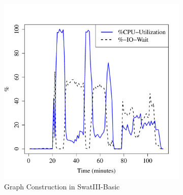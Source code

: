 \documentclass[conference]{IEEEtran}
\begin{document}
\begin{figure}[htb]
        \begin{subfigure}[b]{0.23\textwidth}
                \includegraphics[width=\textwidth]{Figure/SystemData/Plots/BGCPUHDD.pdf}
                \caption{Graph Construction in SwatIII-Basic}
                \label{fig:BGCPUHDD}
        \end{subfigure}
		\begin{subfigure}[b]{0.23\textwidth}

\end{subfigure}
\end{figure}
\end{document}
